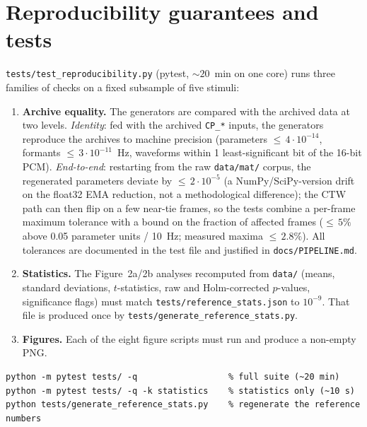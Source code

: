 \documentclass[11pt,a4paper]{article}
\begin{document}
\section{Reproducibility guarantees and tests}
\label{sec:repro}
\texttt{tests/test\_reproducibility.py} (pytest, ${\sim}20$~min on one
core) runs three families of checks on a fixed subsample of five
stimuli:
\begin{enumerate}
\item \textbf{Archive equality.} The generators are compared with the
      archived data at two levels. \emph{Identity}: fed with the
      archived \texttt{CP\_*} inputs, the generators reproduce the
      archives to machine precision (parameters ${\leq}\,4\cdot10^{-14}$,
      formants ${\leq}\,3\cdot10^{-11}$~Hz, waveforms within 1
      least-significant bit of the 16-bit PCM). \emph{End-to-end}:
      restarting from the raw \texttt{data/mat/} corpus, the
      regenerated parameters deviate by ${\leq}\,2\cdot10^{-5}$ (a
      NumPy/SciPy-version drift on the float32 EMA reduction, not a
      methodological difference); the CTW path can then flip on a few
      near-tie frames, so the tests combine a per-frame maximum
      tolerance with a bound on the fraction of affected frames
      (${\leq}\,5\%$ above 0.05 parameter units / 10~Hz; measured
      maxima ${\leq}\,2.8\%$). All tolerances are documented in the
      test file and justified in \texttt{docs/PIPELINE.md}.
\item \textbf{Statistics.} The Figure~2a/2b analyses recomputed from
      \texttt{data/} (means, standard deviations, $t$-statistics,
      raw and Holm-corrected $p$-values, significance flags) must match
      \texttt{tests/reference\_stats.json} to $10^{-9}$. That file is
      produced once by \texttt{tests/generate\_reference\_stats.py}.
\item \textbf{Figures.} Each of the eight figure scripts must run and
      produce a non-empty PNG.
\end{enumerate}
\begin{lstlisting}
python -m pytest tests/ -q                  % full suite (~20 min)
python -m pytest tests/ -q -k statistics    % statistics only (~10 s)
python tests/generate_reference_stats.py    % regenerate the reference numbers
\end{lstlisting}
\end{document}
